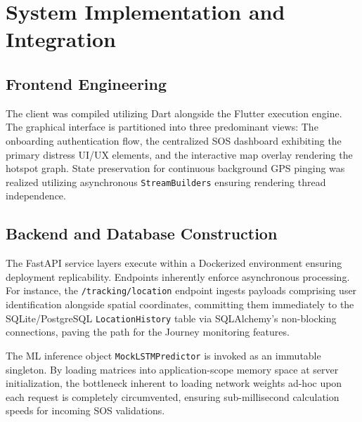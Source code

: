 \documentclass[10pt,journal,compsoc]{IEEEtran}
\begin{document}
\section{System Implementation and Integration}

\subsection{Frontend Engineering}
The client was compiled utilizing Dart alongside the Flutter execution engine. The graphical interface is partitioned into three predominant views: The onboarding authentication flow, the centralized SOS dashboard exhibiting the primary distress UI/UX elements, and the interactive map overlay rendering the hotspot graph. State preservation for continuous background GPS pinging was realized utilizing asynchronous \texttt{StreamBuilders} ensuring rendering thread independence.

\subsection{Backend and Database Construction}
The FastAPI service layers execute within a Dockerized environment ensuring deployment replicability. Endpoints inherently enforce asynchronous processing. For instance, the \texttt{/tracking/location} endpoint ingests payloads comprising user identification alongside spatial coordinates, committing them immediately to the SQLite/PostgreSQL \texttt{LocationHistory} table via SQLAlchemy's non-blocking connections, paving the path for the Journey monitoring features. 

The ML inference object \texttt{MockLSTMPredictor} is invoked as an immutable singleton. By loading matrices into application-scope memory space at server initialization, the bottleneck inherent to loading network weights ad-hoc upon each request is completely circumvented, ensuring sub-millisecond calculation speeds for incoming SOS validations.

\end{document}
